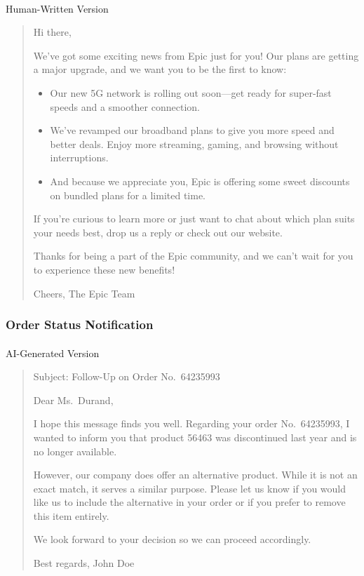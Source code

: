 \documentclass[
]{article}
\makeatletter
\let\oldparagraph\paragraph
\renewcommand{\paragraph}{
    \@ifstar
      \xxxParagraphStar
      \xxxParagraphNoStar
  }
\newcommand{\xxxParagraphStar}[1]{\oldparagraph*{#1}\mbox{}}
\newcommand{\xxxParagraphNoStar}[1]{\oldparagraph{#1}\mbox{}}
\providecommand{\tightlist}{%
  \setlength{\itemsep}{0pt}\setlength{\parskip}{0pt}}\usepackage{longtable,booktabs,array}
\makeatother
\begin{document}
\paragraph{Human-Written Version}\label{human-written-version}

\begin{quote}
Hi there,

We've got some exciting news from Epic just for you! Our plans are
getting a major upgrade, and we want you to be the first to know:

\begin{itemize}
\tightlist
\item
  Our new 5G network is rolling out soon---get ready for super-fast
  speeds and a smoother connection.
\item
  We've revamped our broadband plans to give you more speed and better
  deals. Enjoy more streaming, gaming, and browsing without
  interruptions.
\item
  And because we appreciate you, Epic is offering some sweet discounts
  on bundled plans for a limited time.
\end{itemize}

If you're curious to learn more or just want to chat about which plan
suits your needs best, drop us a reply or check out our website.

Thanks for being a part of the Epic community, and we can't wait for you
to experience these new benefits!

Cheers, The Epic Team
\end{quote}

\subsubsection{Order Status
Notification}\label{order-status-notification}

\paragraph{AI-Generated Version}\label{ai-generated-version-1}

\begin{quote}
Subject: Follow-Up on Order No.~64235993

Dear Ms.~Durand,

I hope this message finds you well. Regarding your order No.~64235993, I
wanted to inform you that product 56463 was discontinued last year and
is no longer available.

However, our company does offer an alternative product. While it is not
an exact match, it serves a similar purpose. Please let us know if you
would like us to include the alternative in your order or if you prefer
to remove this item entirely.

We look forward to your decision so we can proceed accordingly.

Best regards, John Doe
\end{quote}
\end{document}
